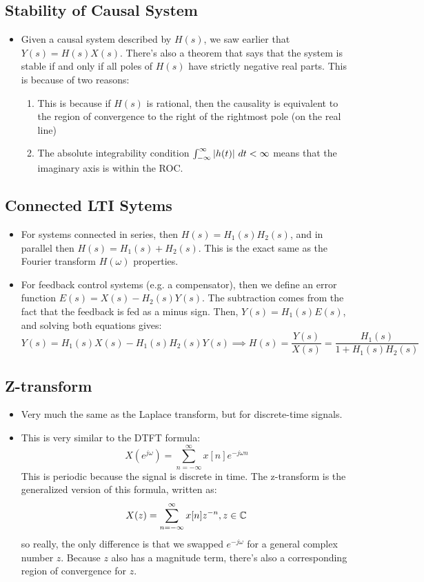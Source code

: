 \subsection{Stability of Causal System}
\begin{itemize}
	\item Given a causal system described by  \( H(s) \), we saw earlier that \( Y(s) = H(s) X(s) \). There's also 
		a theorem that says that the system is stable if and only if all poles of \( H(s) \)  have strictly negative 
		real parts. 
		This is because of two reasons:
		
		\begin{enumerate}[label=\arabic*.]
			\item This is because if \( H(s) \) is rational, 
				then the causality is equivalent to the region of convergence to 
				the right of the rightmost pole (on the real line)
			\item The absolute integrability condition \( \int_{-\infty}^{\infty} |h(t)|\ d t < \infty \) means 
				that the imaginary axis is within the ROC. 
		\end{enumerate}
\end{itemize}
\subsection{Connected LTI Sytems}
\begin{itemize}
	\item For systems connected in series, then \( H(s) = H_1(s)H_2(s) \), and in parallel then
		\( H(s) = H_1(s) + H_2(s) \). This is the exact same as the Fourier transform \( H(\omega) \) properties. 
	\item For feedback control systems (e.g. a compensator), then we define an error function 
		\( E(s) = X(s) - H_2(s) Y(s) \). The subtraction comes from the fact that the feedback is fed 
		as a minus sign. Then, \( Y(s) = H_1(s) E(s) \), and solving both equations 
		gives:
		\[
		Y(s) = H_1(s) X(s) - H_1(s) H_2(s) Y(s) \implies H(s) = \frac{Y(s)}{X(s)} = \frac{H_1(s)}{1 + H_1(s)H_2(s)}
		\] 
\end{itemize}
\subsection{Z-transform}
\begin{itemize}
	\item Very much the same as the Laplace transform, but for discrete-time signals. 
	\item This is very similar to the DTFT formula:
		\[
			X(e^{j \omega}) = \sum_{n=-\infty}^{\infty} x[n] e^{-j \omega n}
		\] 
		This is periodic because the signal is discrete in time. The z-transform is the generalized version of this 
		formula, written as:
		\[
			X(z) = \sum_{n=-\infty}^{\infty} x[n] z^{-n}, z \in \mathbb C
		\] 
		so really, the only difference is that we swapped \( e^{-j \omega} \) for a general complex 
		number \( z \). Because \( z \) also has a magnitude term, there's also a corresponding region of 
		convergence for \( z \). 
\end{itemize}

